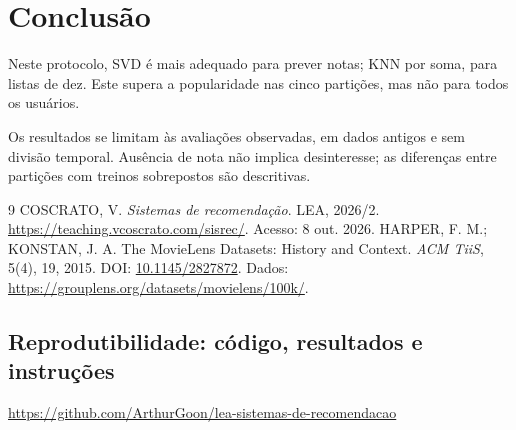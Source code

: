\section{Conclusão}
Neste protocolo, SVD é mais adequado para prever notas; KNN por soma, para
listas de dez. Este supera a popularidade nas cinco partições, mas não para
todos os usuários.

Os resultados se limitam às avaliações observadas, em dados antigos e sem
divisão temporal. Ausência de nota não implica desinteresse; as diferenças
entre partições com treinos sobrepostos são descritivas.

\begin{thebibliography}{9}
\small
{} COSCRATO, V. \emph{Sistemas de recomendação}. LEA, 2026/2.
\url{https://teaching.vcoscrato.com/sisrec/}. Acesso: 8 out. 2026.
 HARPER, F. M.; KONSTAN, J. A.
The MovieLens Datasets: History and Context. \emph{ACM TiiS}, 5(4), 19, 2015.
DOI: \href{https://doi.org/10.1145/2827872}{10.1145/2827872}.
Dados: \url{https://grouplens.org/datasets/movielens/100k/}.
\end{thebibliography}

\subsection*{Reprodutibilidade: código, resultados e instruções}
{\small\noindent\url{https://github.com/ArthurGoon/lea-sistemas-de-recomendacao}}
